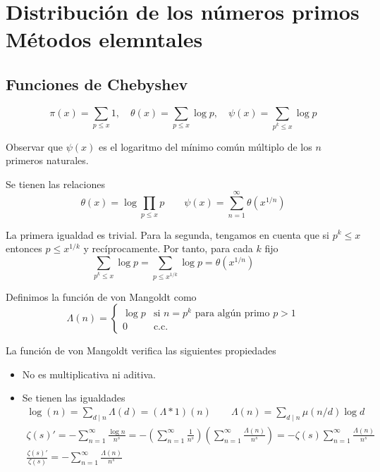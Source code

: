 \documentclass[TAN.tex]{subfiles}
\begin{document}
\chapter{Distribución de los números primos\\Métodos elemntales}

\section{Funciones de Chebyshev}
\begin{nota}
\[ π(x)=\sum_{p≤x} 1, \quad θ(x) = \sum_{p≤x} \log p, \quad ψ(x)=\sum_{p^k≤x} \log p \]
\end{nota}
Observar que $ψ(x)$ es el logaritmo del mínimo común múltiplo de los $n$ primeros naturales.

\begin{prop} Se tienen las relaciones
$$
\theta(x)=\log \prod_{p\leq x} p \qquad\psi(x)=\sum_{n=1}^\infty \theta(x^{1/n})$$
\end{prop}
\begin{dem}
La primera igualdad es trivial. Para la segunda, tengamos en cuenta que si $p^k \leq x$ entonces $p\leq x^{1/k}$ y recíprocamente. Por tanto, para cada $k$ fijo
$$
\sum_{p^k≤x} \log p = \sum_{p≤x^{1/k}} \log p = \theta(x^{1/n}) \qquad 
 $$
\end{dem}
\begin{defi}
Definimos la función de von Mangoldt como
$$
\Lambda(n)=
\begin{cases}
\log p & \text{si $n=p^k$ para algún primo $p>1$}\\
0 & \text{c.c.}
\end{cases}
$$
\end{defi}
\begin{prop}
La función de von Mangoldt verifica las siguientes propiedades
\begin{itemize}
\item No es multiplicativa ni aditiva.
\item Se tienen las igualdades
\begin{gather*}
\log(n) = \sum_{d\mid n} \Lambda(d) = (\Lambda \ast 1)(n) \qquad \Lambda(n) = \sum_{d\mid n} \mu(n/d)\log d \\
\zeta(s)' = - \sum_{n=1}^\infty \frac{\log n}{n^s} = -\left(\sum_{n=1}^\infty \frac{1}{n^s} \right)\left(\sum_{n=1}^\infty \frac{\Lambda(n)}{n^s} \right) = - \zeta(s)\sum_{n=1}^\infty \frac{\Lambda(n)}{n^s} \\
\frac{\zeta(s)'}{\zeta(s)}= -\sum_{n=1}^\infty \frac{\Lambda(n)}{n^s}
\end{gather*}
\end{itemize}
\end{prop}
\end{document}
